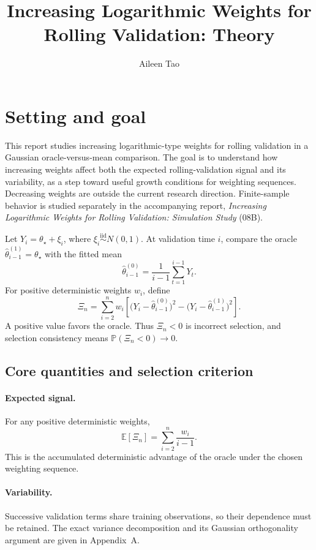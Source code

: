 \documentclass[11pt]{article}
\title{Increasing Logarithmic Weights for Rolling Validation: Theory}
\author{Aileen Tao}
\date{}
\begin{document}
\maketitle

\section{Setting and goal}

This report studies increasing logarithmic-type weights for rolling
validation in a Gaussian oracle-versus-mean comparison.  The goal is to
understand how increasing weights affect both the expected rolling-validation
signal and its variability, as a step toward useful growth conditions for
weighting sequences.  Decreasing weights are outside the current research
direction.  Finite-sample behavior is studied separately in the accompanying
report, \emph{Increasing Logarithmic Weights for Rolling Validation:
Simulation Study} (08B).

Let $Y_i=\theta_\star+\xi_i$, where
$\xi_i\stackrel{\mathrm{iid}}{\sim}N(0,1)$.  At validation time $i$, compare
the oracle $\widehat\theta_{i-1}^{(1)}=\theta_\star$ with the fitted mean
\[
\widehat\theta_{i-1}^{(0)}=\frac{1}{i-1}\sum_{t=1}^{i-1}Y_t.
\]
For positive deterministic weights $w_i$, define
\begin{equation}
\Xi_n=\sum_{i=2}^n w_i\left[
\bigl(Y_i-\widehat\theta_{i-1}^{(0)}\bigr)^2
-\bigl(Y_i-\widehat\theta_{i-1}^{(1)}\bigr)^2\right].
\label{eq:statistic}
\end{equation}
A positive value favors the oracle.  Thus $\Xi_n<0$ is incorrect selection,
and selection consistency means $\mathbb P(\Xi_n<0)\to0$.

\subsection{Core quantities and selection criterion}

\paragraph{Expected signal.}
For any positive deterministic weights,
\begin{equation}
\mathbb E[\Xi_n]=\sum_{i=2}^n\frac{w_i}{i-1}.
\label{eq:mean}
\end{equation}
This is the accumulated deterministic advantage of the oracle under the
chosen weighting sequence.

\paragraph{Variability.}
Successive validation terms share training observations, so their dependence
must be retained.  The exact variance decomposition and its Gaussian
orthogonality argument are given in Appendix~A.
\end{document}
